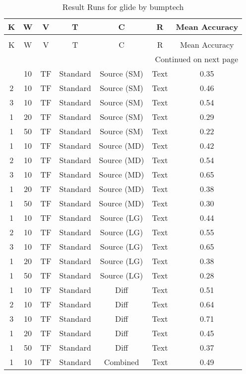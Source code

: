 \begin{longtable}{|c|c|c|c|c|c|c|}
\hline
K & W & V & T & C & R & Mean Accuracy \\
\hline
\endfirsthead
\caption[]{Continued from previous page} \\
\hline
K & W & V & T & C & R & Mean Accuracy \\
\hline
\endhead
\hline
\multicolumn{7}{r}{Continued on next page} \\
\endfoot
\hline
\caption{Result Runs for glide by bumptech} 
\label{result-runs-glide-bumptech}
\endlastfoot
1 & 10 & TF & Standard & Source (SM) & Text & 0.35 \\
\hline
2 & 10 & TF & Standard & Source (SM) & Text & 0.46 \\
\hline
3 & 10 & TF & Standard & Source (SM) & Text & 0.54 \\
\hline
1 & 20 & TF & Standard & Source (SM) & Text & 0.29 \\
\hline
1 & 50 & TF & Standard & Source (SM) & Text & 0.22 \\
\hline
1 & 10 & TF & Standard & Source (MD) & Text & 0.42 \\
\hline
2 & 10 & TF & Standard & Source (MD) & Text & 0.54 \\
\hline
3 & 10 & TF & Standard & Source (MD) & Text & 0.65 \\
\hline
1 & 20 & TF & Standard & Source (MD) & Text & 0.38 \\
\hline
1 & 50 & TF & Standard & Source (MD) & Text & 0.30 \\
\hline
1 & 10 & TF & Standard & Source (LG) & Text & 0.44 \\
\hline
2 & 10 & TF & Standard & Source (LG) & Text & 0.55 \\
\hline
3 & 10 & TF & Standard & Source (LG) & Text & 0.65 \\
\hline
1 & 20 & TF & Standard & Source (LG) & Text & 0.38 \\
\hline
1 & 50 & TF & Standard & Source (LG) & Text & 0.28 \\
\hline
1 & 10 & TF & Standard & Diff & Text & 0.51 \\
\hline
2 & 10 & TF & Standard & Diff & Text & 0.64 \\
\hline
3 & 10 & TF & Standard & Diff & Text & 0.71 \\
\hline
1 & 20 & TF & Standard & Diff & Text & 0.45 \\
\hline
1 & 50 & TF & Standard & Diff & Text & 0.37 \\
\hline
1 & 10 & TF & Standard & Combined & Text & 0.49 \\

\end{longtable}

